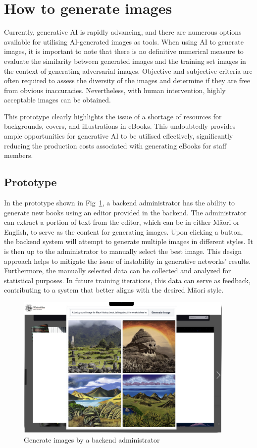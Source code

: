\section{How to generate images} 

Currently, generative AI is rapidly advancing, and there are numerous options available for utilising AI-generated images as tools. 
When using AI to generate images, it is important to note that there is no definitive numerical measure to evaluate the similarity between generated images and the training set images in the context of generating adversarial images. 
Objective and subjective criteria are often required to assess the diversity of the images and determine if they are free from obvious inaccuracies. 
Nevertheless, with human intervention, highly acceptable images can be obtained. 

This prototype clearly highlights the issue of a shortage of resources for backgrounds, covers, and illustrations in  eBooks. 
This undoubtedly provides ample opportunities for generative AI to be utilised effectively, significantly reducing the production costs associated with generating eBooks for staff members.

\subsection{Prototype}

In the prototype shown in Fig~\ref{s-1}, a backend administrator has the ability to generate new books using an editor provided in the backend. 
The administrator can extract a portion of text from the editor, which can be in either Māori or English, to serve as the content for generating images. 
Upon clicking a button, the backend system will attempt to generate multiple images in different styles. 
It is then up to the administrator to manually select the best image. 
This design approach helps to mitigate the issue of instability in generative networks' results. 
Furthermore, the manually selected data can be collected and analyzed for statistical purposes. 
In future training iterations, this data can serve as feedback, contributing to a system that better aligns with the desired Māori style.

\begin{figure}[htbp]
  \centerline{\includegraphics[width=300pt]{images/s-1.png}}
  \caption{Generate images by a backend administrator}
  \label{s-1}
\end{figure}

